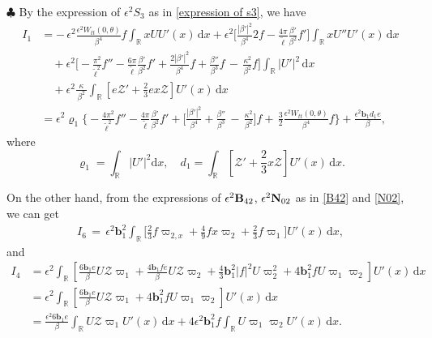\documentclass[10pt, reqno]{amsart}
\numberwithin{equation}{section}
\theoremstyle{definition}
\begin{document}
{\smallskip\noindent$\clubsuit$ By the expression of $\epsilon^2 S_{3}$ as in \eqref{expression of s3}, we have
\begin{align} \label{bar S3intergralUx}
I_1
& = -\, \epsilon^2 \frac{\epsilon^2W_{tt}(0, \theta)}{\beta^4}f \int_{{\mathbb R}} xU U'(x)\,{\mathrm d}x
+\epsilon^2\Big[\frac{|\beta'|^2}{\beta^4} 2f
-\frac{4\pi}{ {\tilde\ell}}\frac{\beta'}{\beta^2}f'
\Big]\int_{{\mathbb R}} xU'' U'(x)\,{\mathrm d}x
\nonumber\\[2mm]
&\quad
+\epsilon^2 \Big[
-\frac{\pi^2}{{\tilde\ell}^2}f''
- \frac{6\pi}{\tilde\ell} \frac{\beta'}{\beta^2} f'
+\frac{2|\beta'|^2}{\beta^4}f
+\frac{\beta''} {\beta^3}f
\,-\,\frac{\kappa^2}{\beta^2}f
\Big]\int_{{\mathbb R}} |U'|^2 \,{\mathrm d}x
\nonumber\\[2mm]
& \quad +\epsilon^2\frac{\kappa}{\, \beta^2\, }\int_{{\mathbb R}}\left[ e{\mathcal Z}'+\frac 23 e x\mathcal Z \right]U'(x) \,{\mathrm d}x
\nonumber\\[2mm]
& = \epsilon^2 \varrho_1\Bigg\{ - \frac{4\pi^2}{{\tilde\ell}^2}f'' - \frac{4\pi}{\tilde\ell} \frac{\beta'}{\beta^2} f'
+ \Big[\frac{|\beta'|^2}{\beta^4}
+\frac{\beta''} {\beta^3}
\,-\,\frac{\kappa^2}{\beta^2} \Big] f + \, \frac 32\frac{\epsilon^2 W_{tt}(0, \theta)}{\beta^4} f\Bigg\}
+ \frac {\epsilon^2 {\mathbf b}_1d_1e}\beta,
\end{align}
where
\[\varrho_1= \int_{\mathbb R} |U'|^2{\mathrm d}x, \quad d_1 = \int_{\mathbb R}\left[ {\mathcal Z}'+\frac 23 x\mathcal Z \right]U'(x) \,{\mathrm d}x. \]

On the other hand, from the expressions of $\epsilon^2 {\bf B}_{42}$, $\epsilon^2{\bf N}_{02}$ as in \eqref{B42} and \eqref{N02}, we can get
\begin{align*}
I_6\,=\, \epsilon^2 {\mathbf b}_1^2\int_{\mathbb R} \Big[
\frac{2}{3}f\varpi_{2,x}
+ \frac{4}{9} f x\varpi_2
+\frac{2}{3}f\varpi_1
\Big]U'(x) \,{\mathrm d}x,
\end{align*}
and
\begin{align*}
I_4
& = \epsilon^2\int_{\mathbb R}\left[\frac{6 {\mathbf b}_1e}\beta U{\mathcal Z}\varpi_1
+\frac{4 {\mathbf b}_1fe}\beta U{\mathcal Z} \varpi_2
+\frac{4}{3}{\mathbf b}_1^2|f|^2 U\varpi_2^2
+ 4{\mathbf b}_1^2f U\varpi_1\varpi_2 \right]U'(x) \,{\mathrm d}x
\nonumber\\[2mm]
& = \epsilon^2\int_{\mathbb R}\left[\frac{6 {\mathbf b}_1e}\beta U{\mathcal Z}\varpi_1
+ 4{\mathbf b}_1^2f U\varpi_1\varpi_2 \right]U'(x) \,{\mathrm d}x
\nonumber\\[2mm]
& = \frac{\epsilon^2 6 {\mathbf b}_1e}\beta\int_{\mathbb R} U{\mathcal Z}\varpi_1 U'(x) \,{\mathrm d}x + 4\epsilon^2{\mathbf b}_1^2f \int_{\mathbb R} U\varpi_1\varpi_2 U'(x) \,{\mathrm d}x.
\end{align*}



}
\end{document}
